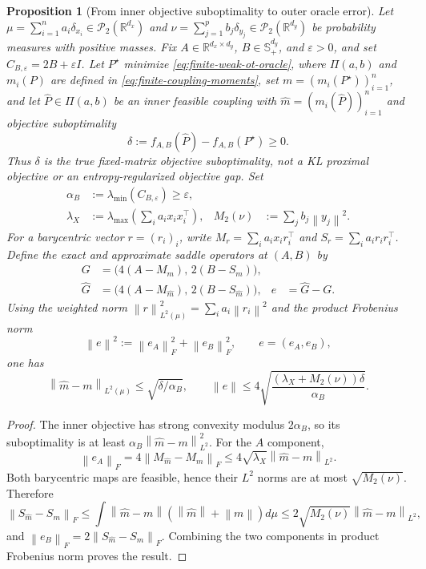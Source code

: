 \documentclass[11pt]{article}
\newcommand{\R}{\mathbb R}
\newcommand{\cP}{\mathcal P}
\newcommand{\norm}[1]{\left\lVert #1\right\rVert}
\theoremstyle{plain}
\newtheorem{proposition}[theorem]{Proposition}
\theoremstyle{definition}
\theoremstyle{remark}
\begin{document}
\begin{proposition}[From inner objective suboptimality to outer oracle error]
\label{prop:inner-gap-oracle-error}
Let \(\mu=\sum_{i=1}^n a_i\delta_{x_i}\in\cP_2(\R^{d_x})\) and
\(\nu=\sum_{j=1}^p b_j\delta_{y_j}\in\cP_2(\R^{d_y})\) be probability
measures with positive masses. Fix \(A\in\R^{d_x\times d_y}\),
\(B\in\mathbb S_+^{d_y}\), and \(\varepsilon>0\), and set
\(C_{B,\varepsilon}=2B+\varepsilon I\). Let \(P^\star\) minimize
\eqref{eq:finite-weak-ot-oracle}, where \(\Pi(a,b)\) and \(m_i(P)\) are defined
in \eqref{eq:finite-coupling-moments}, set
\(m=(m_i(P^\star))_{i=1}^n\), and let \(\widehat P\in\Pi(a,b)\) be an inner
feasible coupling with
\(\widehat m=(m_i(\widehat P))_{i=1}^n\) and objective suboptimality
\[
 \delta:=f_{A,B}(\widehat P)-f_{A,B}(P^\star)\ge0.
\]
Thus \(\delta\) is the true fixed-matrix objective suboptimality, not a KL
proximal objective or an entropy-regularized objective gap.
Set
\[
\begin{aligned}
 \alpha_B&:=\lambda_{\min}(C_{B,\varepsilon})\ge\varepsilon,\\
 \lambda_X&:=\lambda_{\max}\!\left(\sum_i a_i x_ix_i^\top\right),
 &M_2(\nu)&:=\sum_j b_j\norm{y_j}^2.
\end{aligned}
\]
For a barycentric vector \(r=(r_i)_i\), write
\(M_r=\sum_i a_i x_ir_i^\top\) and
\(S_r=\sum_i a_i r_ir_i^\top\). Define the exact and approximate saddle
operators at \((A,B)\) by
\[
\begin{aligned}
 G&=\bigl(4(A-M_m),\,2(B-S_m)\bigr),\\
 \widehat G&=\bigl(4(A-M_{\widehat m}),\,2(B-S_{\widehat m})\bigr),
 &e&=\widehat G-G.
\end{aligned}
\]
Using the weighted norm
\(\norm r_{L^2(\mu)}^2=\sum_i a_i\norm{r_i}^2\) and the product Frobenius
norm
\[
 \norm e^2:=\norm{e_A}_F^2+\norm{e_B}_F^2,
 \qquad e=(e_A,e_B),
\]
one has
\[
  \norm{\widehat m-m}_{L^2(\mu)}\le\sqrt{\delta/\alpha_B},
  \qquad
  \norm{e}\le4\sqrt{\frac{(\lambda_X+M_2(\nu))\delta}{\alpha_B}}.
\]
\end{proposition}

\begin{proof}
The inner objective has strong convexity modulus $2\alpha_B$, so its
suboptimality is at
least $\alpha_B\norm{\widehat m-m}_{L^2}^2$. For the $A$ component,
\[
 \norm{e_A}_F=4\norm{M_{\widehat m}-M_m}_F
 \le4\sqrt{\lambda_X}\norm{\widehat m-m}_{L^2}.
\]
Both barycentric maps are feasible, hence their $L^2$ norms are at most
$\sqrt{M_2(\nu)}$. Therefore
\[
 \norm{S_{\widehat m}-S_m}_F
 \le\int\norm{\widehat m-m}(\norm{\widehat m}+\norm m)d\mu
 \le2\sqrt{M_2(\nu)}\norm{\widehat m-m}_{L^2},
\]
and $\norm{e_B}_F=2\norm{S_{\widehat m}-S_m}_F$. Combining the two components
in product Frobenius norm proves the result.
\end{proof}
\end{document}
